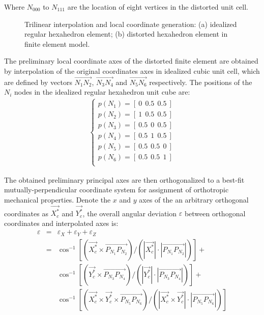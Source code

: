 \documentclass[12pt]{extbook}
\begin{document}
Where $N_{000}$ to $N_{111}$ are the location of eight vertices in the distorted unit cell.\\

\begin{figure}[htbp]
\centering
{}
\caption{Trilinear interpolation and local coordinate generation: (a) idealized regular hexahedron element; (b) distorted hexahedron element in finite element model.}
\label{interpolation}
\end{figure}

The preliminary local coordinate axes of the distorted finite element are obtained by interpolation of the original coordinates axes in idealized cubic unit cell, which are defined by vectors $\overrightarrow{N_1N_2}$, $\overrightarrow{N_3N_4}$ and $\overrightarrow{N_5N_6}$ respectively. The positions of the $N_i$ nodes in the idealized regular hexahedron unit cube are:
\begin{equation}
\begin{split}
\left\{
\begin{array}{l}
p(N_1) = [~0 ~~ 0.5 ~~ 0.5~]\\
p(N_2) = [~1 ~~ 0.5 ~~ 0.5~]\\
p(N_3) = [~0.5 ~~ 0 ~~ 0.5~]\\
p(N_4) = [~0.5 ~~ 1 ~~ 0.5~]\\
p(N_5) = [~0.5 ~~ 0.5 ~~ 0~]\\
p(N_6) = [~0.5 ~~ 0.5 ~~ 1~]\\
\end{array}
\right.
\end{split}
\label{3-1-5}
\end{equation}

The obtained preliminary principal axes are then orthogonalized to a best-fit mutually-perpendicular coordinate system for assignment of orthotropic mechanical properties. Denote the $x$ and $y$ axes of the an arbitrary orthogonal coordinates as $\overrightarrow{X^*_c}$ and $\overrightarrow{Y^*_c}$, the overall angular deviation $\varepsilon$ between orthogonal coordinates and interpolated axes is:
\begin{equation}
\begin{array}{lll}
\varepsilon & = & \varepsilon_X + \varepsilon_Y + \varepsilon_Z\\
& = & \cos^{-1}[(\overrightarrow{X^*_c}\times\overrightarrow{P_{N_1}P_{N_2}}) / (|\overrightarrow{X^*_c}|\cdot|\overrightarrow{P_{N_1}P_{N_2}}|)] + \\
& & \cos^{-1}[(\overrightarrow{Y^*_c}\times\overrightarrow{P_{N_3}P_{N_4}}) / (|\overrightarrow{Y^*_c}|\cdot|\overrightarrow{P_{N_3}P_{N_4}}|)] + \\
& & \cos^{-1}[(\overrightarrow{X^*_c}\times\overrightarrow{Y^*_c}\times\overrightarrow{P_{N_5}P_{N_6}}) / (|\overrightarrow{X^*_c}\times\overrightarrow{Y^*_c}|\cdot|\overrightarrow{P_{N_5}P_{N_6}}|)]
\end{array}
\label{3-1-6}
\end{equation}
\end{document}
